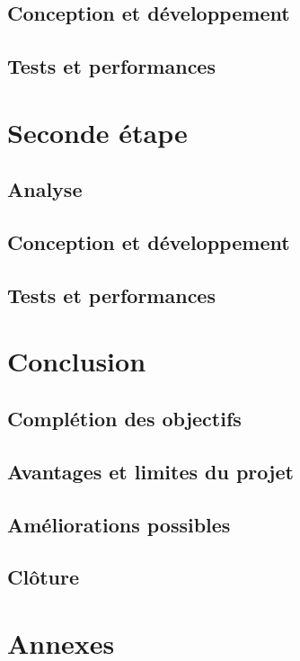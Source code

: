\documentclass[a4paper, 12pt]{report}
\begin{document}
    \section{Conception et développement}
    \section{Tests et performances}


\chapter{Seconde étape}
\minitoc
{}
\clearpage
    \section{Analyse}
    \section{Conception et développement}
    \section{Tests et performances}

\chapter{Conclusion}
\minitoc
{}
\clearpage
    \section{Complétion des objectifs}
    \section{Avantages et limites du projet}
    \section{Améliorations possibles}
    \section{Clôture}

\chapter{Annexes}
\minitoc
{}
\clearpage            

\appendix
\end{document}
